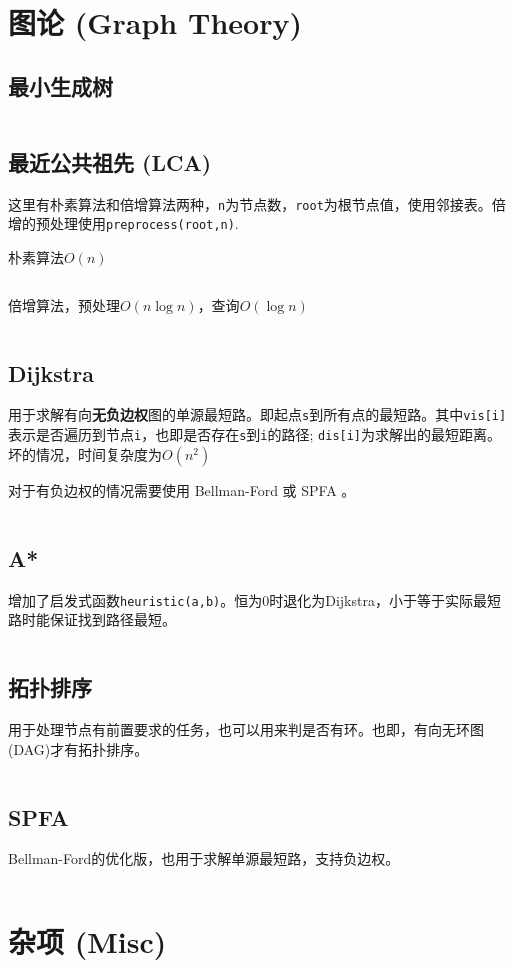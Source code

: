 \documentclass[openany,a4paper]{book}
\begin{document}
\chapter{图论 (Graph Theory)}
\section{最小生成树}
\inputminted{cpp}{Algorithm/mst.h}

\section{最近公共祖先 (LCA)}
这里有朴素算法和倍增算法两种，\verb|n|为节点数，\verb|root|为根节点值，使用邻接表。倍增的预处理使用\verb|preprocess(root,n)|.
\par 朴素算法$O(n)$
\inputminted{cpp}{GraphTheory/LCA-1.h}
倍增算法，预处理$O(n\log n)$，查询$O(\log n)$
\inputminted{cpp}{GraphTheory/LCA-2.h}


\section{Dijkstra}
用于求解有向\textbf{无负边权}图的单源最短路。即起点\verb|s|到所有点的最短路。其中\verb|vis[i]|表示是否遍历到节点\verb|i|，也即是否存在\verb|s|到\verb|i|的路径; \verb|dis[i]|为求解出的最短距离。坏的情况，时间复杂度为$O(n^2)$
\par 对于有负边权的情况需要使用 Bellman-Ford 或 SPFA 。
\inputminted{cpp}{GraphTheory/Dijkstra.h}

\section{A*}
增加了启发式函数\verb|heuristic(a,b)|。恒为0时退化为Dijkstra，小于等于实际最短路时能保证找到路径最短。
\inputminted{cpp}{GraphTheory/Astar.h}

\section{拓扑排序}
用于处理节点有前置要求的任务，也可以用来判是否有环。也即，有向无环图(DAG)才有拓扑排序。
\inputminted{cpp}{GraphTheory/TopoSort.h}

\section{SPFA}
Bellman-Ford的优化版，也用于求解单源最短路，支持负边权。
\inputminted{cpp}{GraphTheory/SPFA.h}

\chapter{杂项 (Misc)}
\end{document}
